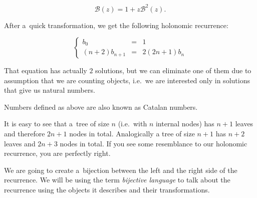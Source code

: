 \documentclass[final]{article}
\theoremstyle{definition}
\theoremstyle{definition}
\theoremstyle{remark}
\newcommand{\gf}[1]{\ensuremath{\mathcal{#1}}}
\begin{document}
\[\gf{B}(z) = 1 + z\gf{B}^2(z).\]

After a~quick transformation, we get the following holonomic recurrence:

\[\left\{\begin{array}{rcl}
            b_0 &=& 1\\
            (n + 2)b_{n + 1} &=& 2 (2n + 1)b_n
\end{array}\right.\]

That equation has actually \(2\) solutions, but we can eliminate one of them due to assumption that we are counting objects, i.e.~we are interested only in solutions that give us natural numbers.

Numbers defined as above are also known as Catalan numbers.

It is easy to see that a~tree of size \(n\) (i.e.~with \(n\) internal nodes) has \(n + 1\) leaves and therefore \(2n + 1\) nodes in total. Analogically a tree of size \(n + 1\) has \(n + 2\) leaves and \(2n + 3\) nodes in total. If you see some resemblance to our holonomic recurrence, you are perfectly right.

We are going to create a~bijection between the left and the right side of the recurrence. We will be using the term \textit{bijective language} to talk about the recurrence using the objects it describes and their transformations.
\end{document}

